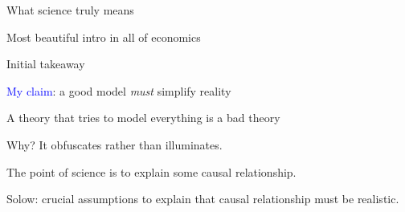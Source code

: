 \documentclass[notes,11pt, aspectratio=169, xcolor=table]{beamer}
\newcommand{\blue}[1]{\textcolor{blue}{#1}}
\newenvironment{wideitemize}{\itemize\addtolength{\itemsep}{10pt}}{\enditemize}
\begin{document}
 \begin{frame}{What science truly means}
\end{frame}

 \begin{frame}{Most beautiful intro in all of economics}
    
    \end{frame}

\begin{frame}{Initial takeaway}

\begin{wideitemize}
    \item \blue{My claim}: a good model \textit{must} simplify reality
    \item<2-> A theory that tries to model everything is a bad theory
    \item<3-> Why? It obfuscates rather than illuminates.
    \item<4-> The point of science is to explain some causal relationship.
    \item<5-> Solow: crucial assumptions to explain that causal relationship must be  realistic.
\end{wideitemize}
    
\end{frame}
\end{document}
